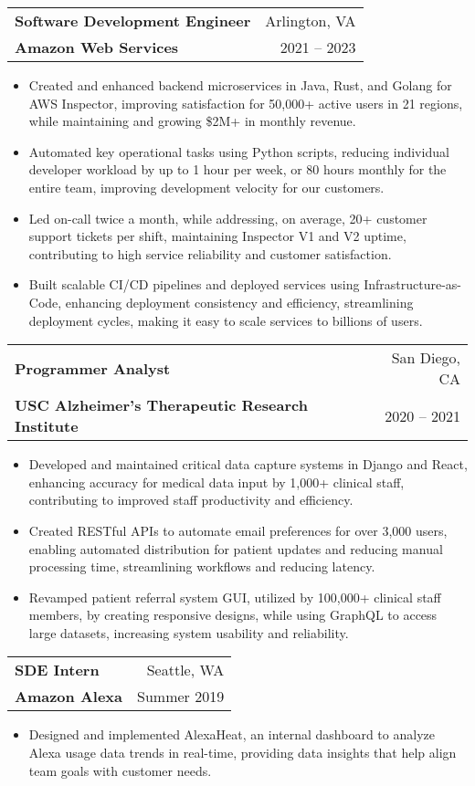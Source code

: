 \documentclass[letterpaper,11pt]{article}
\makeatletter
\newcommand{\resumeSubheading}[4]{
  \vspace{-1pt}\item
    \begin{tabular*}{0.98\textwidth}[t]{l@{\extracolsep{\fill}}r}
      \textbf{#1} & #2 \\
      {\small#3} & {\small #4} \\
    \end{tabular*}\vspace{-5pt}
}
\newcommand{\resumeItemListStart}{\begin{itemize}[leftmargin=*]}
\newcommand{\resumeItemListEnd}{\end{itemize}\vspace{-5pt}}
\makeatother
\begin{document}
\resumeSubheading
  {Software Development Engineer}{Arlington, VA}
  {\textbf{Amazon Web Services}}{2021 -- 2023}
    \resumeItemListStart
      \item {Created and enhanced backend microservices in Java, Rust, and Golang for AWS Inspector, improving \linebreak satisfaction for 50,000+ active users in 21 regions, while maintaining and growing \$2M+ in monthly revenue.}
      \item {Automated key operational tasks using Python scripts, reducing individual developer workload by up to 1 hour per week, or 80 hours monthly for the entire team, improving development velocity for our customers.}
      \item {Led on-call twice a month, while addressing, on average, 20+ customer support tickets per shift, maintaining Inspector V1 and V2 uptime, contributing to high service reliability and customer satisfaction.}
      \item {Built scalable CI/CD pipelines and deployed services using Infrastructure-as-Code, enhancing deployment consistency and efficiency, streamlining deployment cycles, making it easy to scale services to billions of users.}
    \resumeItemListEnd

\resumeSubheading
  {Programmer Analyst}{San Diego, CA}
  {\textbf{USC Alzheimer’s Therapeutic Research Institute}}{2020 -- 2021}
    \resumeItemListStart
      \item {Developed and maintained critical data capture systems in Django and React, enhancing accuracy for \linebreak medical data input by 1,000+ clinical staff, contributing to improved staff productivity and efficiency.}
      \item {Created RESTful APIs to automate email preferences for over 3,000 users, enabling automated distribution for patient updates and reducing manual processing time, streamlining workflows and reducing latency.}
      \item {Revamped patient referral system GUI, utilized by 100,000+ clinical staff members, by creating responsive designs, while using GraphQL to access large datasets, increasing system usability and reliability.}
    \resumeItemListEnd

\resumeSubheading
  {SDE Intern}{Seattle, WA}
  {\textbf{Amazon Alexa}}{Summer 2019}
    \resumeItemListStart
      \item {Designed and implemented AlexaHeat, an internal dashboard to analyze Alexa usage data trends in real-time, providing data insights that help align team goals with customer needs.}
    \resumeItemListEnd
\end{document}
